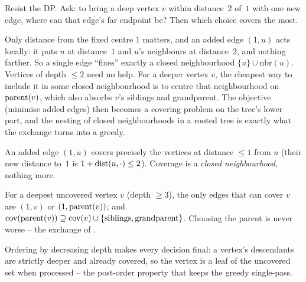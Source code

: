 \begin{attemptgate}
Resist the DP. Ask: to bring a deep vertex $v$ within distance~$2$ of~$1$ with one new
edge, where can that edge's far endpoint be? Then which choice covers the most.
\end{attemptgate}

Only distance from the fixed centre $1$ matters, and an added edge $(1,u)$ acts locally:
it puts $u$ at distance~$1$ and $u$'s neighbours at distance~$2$, and nothing farther.
So a single edge ``fixes'' exactly a closed neighbourhood $\{u\}\cup\mathrm{nbr}(u)$. Vertices
of depth $\le 2$ need no help. For a deeper vertex $v$, the cheapest way to include it in
some closed neighbourhood is to centre that neighbourhood on $\operatorname{parent}(v)$, which also
absorbs $v$'s siblings and grandparent. The objective (minimise added edges) then becomes
a covering problem on the tree's lower part, and the nesting of closed neighbourhoods in a
rooted tree is exactly what the exchange turns into a greedy.

\begin{observation}
An added edge $(1,u)$ covers precisely the vertices at distance $\le 1$ from $u$
(their new distance to~$1$ is $1+\operatorname{dist}(u,\cdot)\le 2$). Coverage is a \emph{closed
neighbourhood}, nothing more.
\end{observation}
\begin{observation}
For a deepest uncovered vertex $v$ (depth $\ge 3$), the only edges that can cover $v$
are $(1,v)$ or $(1,\operatorname{parent}(v))$; and $\mathrm{cov}(\operatorname{parent}(v)) \supseteq \mathrm{cov}(v)
\cup\{\text{siblings},\text{grandparent}\}$. Choosing the parent is never worse -- the
exchange of .
\end{observation}
\begin{observation}
Ordering by decreasing depth makes every decision final: a vertex's descendants are
strictly deeper and already covered, so the vertex is a leaf of the uncovered set when
processed -- the post-order property that keeps the greedy single-pass.
\end{observation}

